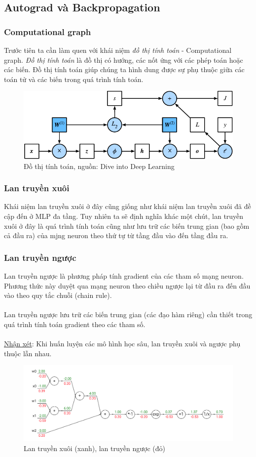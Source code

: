 \documentclass{article}
\begin{document}
 \subsection{Autograd và Backpropagation}
 \subsubsection{Computational graph}
 Trước tiên ta cần làm quen với khái niệm \textit{đồ thị tính toán} - Computational graph. \textit{Đồ thị tính toán} là đồ thị có hướng, các nốt ứng với các phép toán hoặc các biến. Đồ thị tính toán giúp chúng ta hình dung được sự phụ thuộc giữa các toán tử và các biến trong quá trình tính toán.
 \begin{figure}[ht!]
     \centering
     \includegraphics[width = 0.6\linewidth]{forward.pdf}
     \caption{Đồ thị tính toán, nguồn: Dive into Deep Learning}
     \label{fig22}
 \end{figure}
 \subsubsection{Lan truyền xuôi}
 Khái niệm lan truyền xuôi ở đây cũng giống như khái niệm lan truyền xuôi đã đề cập đến ở MLP đa tầng. Tuy nhiên ta sẽ định nghĩa khác một chút, lan truyền xuôi ở đây là quá trình tính toán cũng như lưu trữ các biến trung gian (bao gồm cả đầu ra) của mjng neuron theo thứ tự từ tầng đầu vào đến tầng đầu ra. 
 \subsubsection{Lan truyền ngược}
 Lan truyền ngược là phương pháp tính gradient của các tham số mạng neuron. Phương thức này duyệt qua mạng neuron theo chiều ngược lại từ đầu ra đến đầu vào theo quy tắc chuỗi (chain rule).\\\\
 Lan truyền ngược lưu trữ các biến trung gian (các đạo hàm riêng) cần thiết trong quá trình tính toán gradient theo các tham số.\\\\
 \underline{Nhận xét}: Khi huấn luyện các mô hình học sâu, lan truyền xuôi và ngược phụ thuộc lẫn nhau.
  \begin{figure}[ht!]
     \centering
     \includegraphics[width = \linewidth]{4.png}
     \caption{Lan truyền xuôi (xanh), lan truyền ngược (đỏ)}
     \label{fig23}
 \end{figure}
\end{document}
